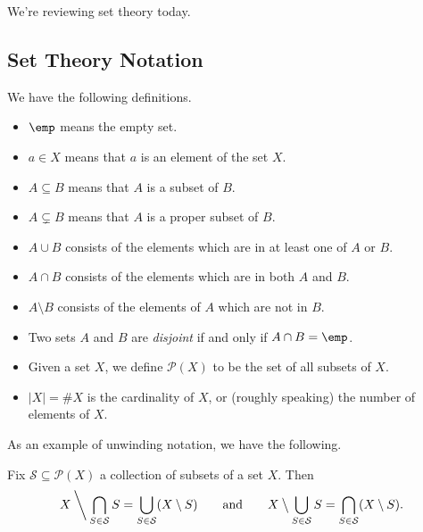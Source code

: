 \documentclass[../notes.tex]{subfiles}
\begin{document}

We're reviewing set theory today.

\subsection{Set Theory Notation}
We have the following definitions.
\begin{itemize}
	\item $\emp$ means the empty set.
	\item $a\in X$ means that $a$ is an element of the set $X$.
	\item $A\subseteq B$ means that $A$ is a subset of $B$.
	\item $A\subsetneq B$ means that $A$ is a proper subset of $B$.
	\item $A\cup B$ consists of the elements which are in at least one of $A$ or $B$.
	\item $A\cap B$ consists of the elements which are in both $A$ and $B$.
	\item $A\setminus B$ consists of the elements of $A$ which are not in $B$.
	\item Two sets $A$ and $B$ are \textit{disjoint} if and only if $A\cap B=\emp$.
	\item Given a set $X$, we define $\mathcal P(X)$ to be the set of all subsets of $X$.
	\item $|X|=\#X$ is the cardinality of $X$, or (roughly speaking) the number of elements of $X$.
\end{itemize}
As an example of unwinding notation, we have the following.
\begin{proposition}
	Fix $\mathcal S\subseteq\mathcal P(X)$ a collection of subsets of a set $X$. Then
	\[X\mathbin{\bigg\backslash} \bigcap_{S\in\mathcal S}S=\bigcup_{S\in\mathcal S}(X\setminus S)\qquad\text{and}\qquad X\mathbin{\big\backslash}\bigcup_{S\in\mathcal S}S=\bigcap_{S\in\mathcal S}(X\setminus S).\]
\end{proposition}
\end{document}

